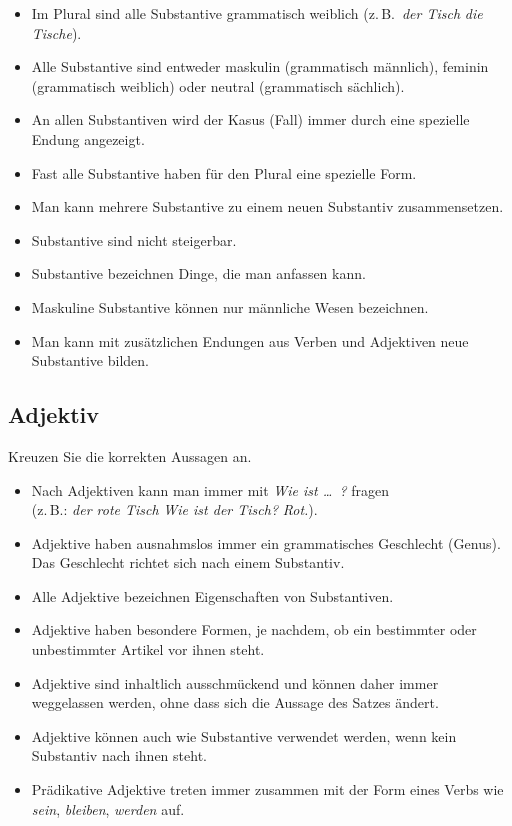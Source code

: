 \documentclass[12pt,a4paper,twoside]{article}
\begin{document}
\begin{itemize}[label=\Square]\Lf
  \item Im Plural sind alle Substantive grammatisch weiblich (z.\,B.\ \textit{der Tisch}  \textit{die Tische}).
  \item[\Solcross] Alle Substantive sind entweder maskulin (grammatisch männlich), feminin (grammatisch weiblich) oder neutral (grammatisch sächlich).
  \item An allen Substantiven wird der Kasus (Fall) immer durch eine spezielle Endung angezeigt.
  \item[\Solcross] Fast alle Substantive haben für den Plural eine spezielle Form.
  \item[\Solcross] Man kann mehrere Substantive zu einem neuen Substantiv zusammensetzen.
  \item[\Solcross] Substantive sind nicht steigerbar.
  \item Substantive bezeichnen Dinge, die man anfassen kann.
  \item Maskuline Substantive können nur männliche Wesen bezeichnen.
  \item[\Solcross] Man kann mit zusätzlichen Endungen aus Verben und Adjektiven neue Substantive bilden.
\end{itemize}


\subsection{\morphologieaufgabe Adjektiv}

Kreuzen Sie die korrekten Aussagen an.

\begin{itemize}[label=\Square]\Lf
  \item Nach Adjektiven kann man immer mit \textit{Wie ist \ldots\ ?} fragen\\
    (z.\,B.: \textit{der rote Tisch}  \textit{Wie ist der Tisch?}  \textit{Rot.}).
  \item Adjektive haben ausnahmslos immer ein grammatisches Geschlecht (Genus).
    Das Geschlecht richtet sich nach einem Substantiv.
  \item Alle Adjektive bezeichnen Eigenschaften von Substantiven.
  \item[\Solcross] Adjektive haben besondere Formen, je nachdem, ob ein bestimmter oder unbestimmter Artikel vor ihnen steht.
  \item Adjektive sind inhaltlich ausschmückend und können daher immer weggelassen werden, ohne dass sich die Aussage des Satzes ändert.
  \item[\Solcross] Adjektive können auch wie Substantive verwendet werden, wenn kein Substantiv nach ihnen steht.
  \item[\Solcross] Prädikative Adjektive treten immer zusammen mit der Form eines Verbs wie \textit{sein}, \textit{bleiben}, \textit{werden} auf. 
\end{itemize}
\end{document}
